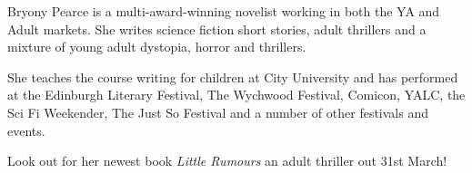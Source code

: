 Bryony Pearce is a multi-award-winning novelist working in both the YA and Adult markets. She writes science fiction short stories, adult thrillers and a mixture of young adult dystopia, horror and thrillers. 

She teaches the course writing for children at City University and has performed at the Edinburgh Literary Festival, The Wychwood Festival, Comicon, YALC, the Sci Fi Weekender, The Just So Festival and a number of other festivals and events.

Look out for her newest book \emph{Little Rumours} an adult thriller out 31st March!